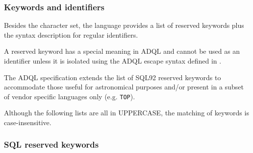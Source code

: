 \documentclass[11pt,a4paper]{ivoa}
\begin{document}
\subsubsection{Keywords and identifiers}
\label{sec:keywords}

Besides the character set, the language provides a list of reserved keywords
plus the syntax description for regular identifiers.

A reserved keyword has a special meaning in ADQL and cannot be used as
an identifier unless it is isolated using the ADQL escape syntax defined
in .

The ADQL specification extends the list of SQL92 reserved keywords to accommodate
those useful for astronomical purposes and/or present in a subset of vendor
specific languages only (e.g. \verb:TOP:).

Although the following lists are all in UPPERCASE, the matching of keywords
is case-insensitive.

\subsubsection{SQL reserved keywords}
\label{sec:adql.keywords}
\end{document}
